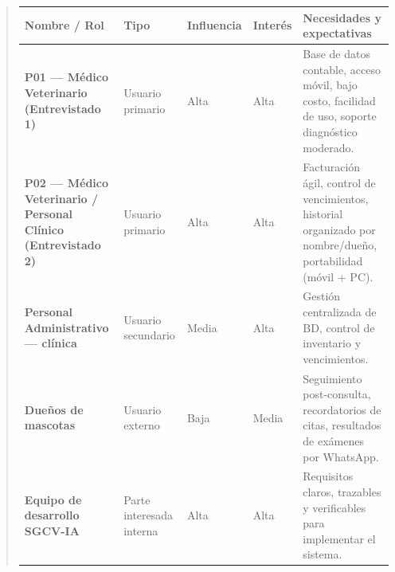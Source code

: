 \documentclass[
]{article}
\newcounter{none} %
\begin{document}
\begin{quote}
{\def\LTcaptype{none} %
\begin{longtable}[]{|
  >{\raggedright\arraybackslash}p{}|
  >{\raggedright\arraybackslash}p{}|
  >{\centering\arraybackslash}p{}|
  >{\centering\arraybackslash}p{}|
  >{\raggedright\arraybackslash}p{}|}
\hline
\begin{minipage}[b]{\linewidth}\raggedright
\textbf{Nombre / Rol}
\end{minipage} & \begin{minipage}[b]{\linewidth}\centering
\textbf{Tipo}
\end{minipage} & \begin{minipage}[b]{\linewidth}\centering
\textbf{Influencia}
\end{minipage} & \begin{minipage}[b]{\linewidth}\centering
\textbf{Interés}
\end{minipage} & \begin{minipage}[b]{\linewidth}\raggedright
\textbf{Necesidades y expectativas}
\end{minipage} \\
\hline
\endhead
\hline
\endlastfoot
\textbf{P01 --- Médico Veterinario (Entrevistado 1)} &
\begin{minipage}[t]{\linewidth}\raggedright
Usuario primario
\end{minipage} & Alta & Alta & Base de datos contable, acceso móvil,
bajo costo, facilidad de uso, soporte diagnóstico moderado. \\
\hline
\textbf{P02 --- Médico Veterinario / Personal Clínico (Entrevistado
2)} & \begin{minipage}[t]{\linewidth}\raggedright
Usuario primario
\end{minipage} & Alta & Alta & Facturación ágil, control de
vencimientos, historial organizado por nombre/dueño, portabilidad (móvil + PC). \\
\hline
\textbf{Personal Administrativo --- clínica} &
\begin{minipage}[t]{\linewidth}\raggedright
Usuario secundario
\end{minipage} & Media & Alta & Gestión centralizada de BD, control de
inventario y vencimientos. \\
\hline
\textbf{Dueños de mascotas} &
\begin{minipage}[t]{\linewidth}\raggedright
Usuario externo
\end{minipage} & Baja & Media & Seguimiento post-consulta, recordatorios
de citas, resultados de exámenes por WhatsApp. \\
\hline
\textbf{Equipo de desarrollo SGCV-IA} &
\begin{minipage}[t]{\linewidth}\raggedright
Parte interesada interna
\end{minipage} & Alta & Alta & Requisitos claros, trazables y
verificables para implementar el sistema. \\
\hline
\end{longtable}
}


\end{quote}
\end{document}
